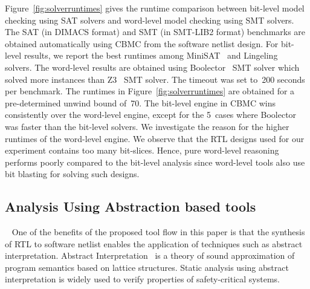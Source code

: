 %
%
Figure~\ref{fig:solverruntimes} gives the runtime comparison between bit-level 
model checking using SAT solvers and word-level model checking using SMT solvers.  
% 
The SAT (in DIMACS format) and SMT (in SMT-LIB2 format) benchmarks are obtained 
automatically using CBMC from the software netlist design. 
%  
For bit-level results, we report the best runtimes among MiniSAT~\cite{minisat} 
and Lingeling~\cite{lingeling} solvers.  The word-level results are obtained 
using Boolector~\cite{boolector} SMT solver which solved more instances 
than Z3~\cite{z32008} SMT solver. 
%  
The timeout was set to~200 seconds per benchmark.  
%
The runtimes in Figure~\ref{fig:solverruntimes} are obtained for 
a pre-determined unwind bound of~70.  The bit-level engine in CBMC 
wins consistently over the word-level engine, except for the 5~cases 
where Boolector was faster than the bit-level solvers.   
% 
We investigate the reason for the higher runtimes of the 
word-level engine. We observe that the RTL designs used 
for our experiment contains too many bit-slices. 
Hence, pure word-level reasoning performs poorly compared 
to the bit-level analysis since word-level tools also use 
bit blasting for solving such designs. 
%
\subsection{Analysis Using Abstraction based tools}~\label{abstraction}
%
One of the benefits of the proposed tool flow in this paper is that the 
synthesis of RTL to software netlist enables the application of techniques 
such as abstract interpretation. Abstract Interpretation~\cite{Cousot92,CC79} 
is a theory of sound approximation of program semantics based on lattice 
structures. Static analysis using abstract interpretation is widely used 
to verify properties of safety-critical systems. 


